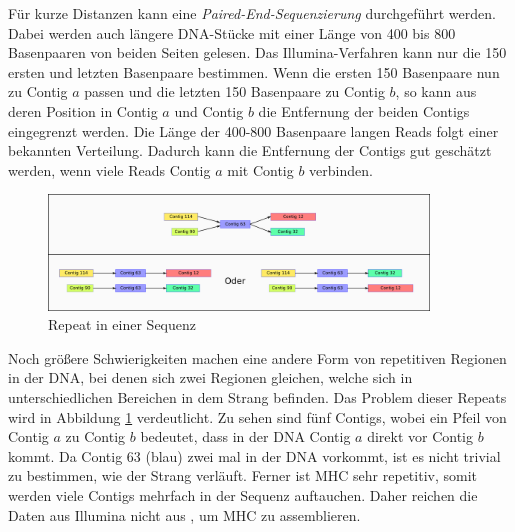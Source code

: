 Für kurze Distanzen kann eine 
\emph{Paired-End-Sequenzierung} \cite{berka2009paired} durchgeführt werden.
Dabei werden auch längere DNA-Stücke mit einer Länge von 400 bis 800 Basenpaaren von beiden Seiten gelesen. Das Illumina-Verfahren kann nur die 150 ersten und letzten Basenpaare bestimmen. Wenn die ersten 150 Basenpaare nun zu Contig $a$ passen und die letzten 150 Basenpaare zu Contig $b$, so kann aus deren Position in Contig $a$ und Contig $b$ die Entfernung der beiden Contigs eingegrenzt werden. Die Länge der 400-800 Basenpaare langen Reads folgt einer bekannten Verteilung. Dadurch kann die Entfernung der Contigs gut geschätzt werden, wenn viele Reads Contig $a$ mit Contig $b$ verbinden.





\begin{figure}[h!]
\begin{center}
\includegraphics[width=0.9\textwidth]{bilder/repeat}
\end{center}
\caption{Repeat in einer Sequenz}
\label{repeat}
\end{figure}



Noch größere Schwierigkeiten machen eine andere Form von repetitiven Regionen in der DNA, bei denen sich zwei Regionen gleichen, welche 
sich in unterschiedlichen Bereichen in dem Strang befinden. Das Problem dieser Repeats wird in Abbildung \ref{repeat} verdeutlicht. 
Zu sehen sind fünf Contigs, wobei ein Pfeil von Contig $a$ zu Contig $b$ bedeutet, dass in der DNA Contig $a$ direkt vor Contig $b$ kommt. Da Contig 63 (blau) zwei mal in der DNA vorkommt, ist es nicht trivial zu bestimmen, wie der Strang verläuft. 
Ferner ist MHC sehr repetitiv, somit werden viele Contigs mehrfach in der Sequenz auftauchen. Daher reichen die Daten aus Illumina nicht aus
, um MHC zu assemblieren.


